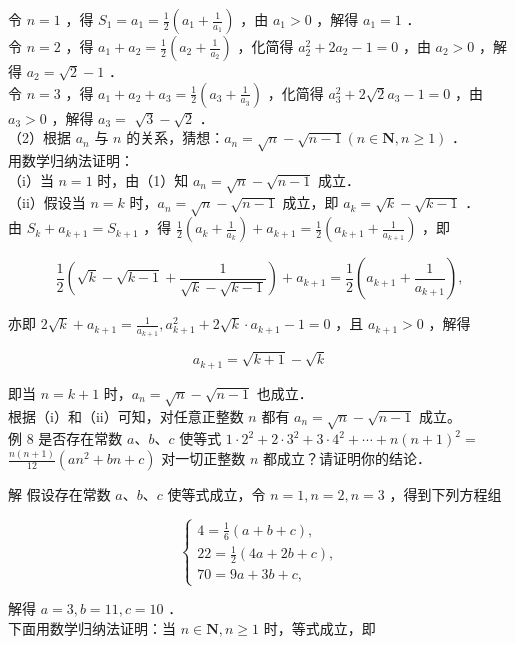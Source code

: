 \documentclass[10pt]{article}
\begin{document}
令 \(n=1\) ，得 \(S_{1}=a_{1}=\frac{1}{2}\left(a_{1}+\frac{1}{a_{1}}\right)\) ，由 \(a_{1}>0\) ，解得 \(a_{1}=1\) ．\\
令 \(n=2\) ，得 \(a_{1}+a_{2}=\frac{1}{2}\left(a_{2}+\frac{1}{a_{2}}\right)\) ，化简得 \(a_{2}^{2}+2 a_{2}-1=0\) ，由 \(a_{2}>0\) ，解得 \(a_{2}=\sqrt{2}-1\) ．\\
令 \(n=3\) ，得 \(a_{1}+a_{2}+a_{3}=\frac{1}{2}\left(a_{3}+\frac{1}{a_{3}}\right)\) ，化简得 \(a_{3}^{2}+2 \sqrt{2} a_{3}-1=0\) ，由 \(a_{3}>0\) ，解得 \(a_{3}=\) \(\sqrt{3}-\sqrt{2}\) ．\\
（2）根据 \(a_{n}\) 与 \(n\) 的关系，猜想：\(a_{n}=\sqrt{n}-\sqrt{n-1}(n \in \mathbf{N}, n \geqslant 1)\) ．\\
用数学归纳法证明：\\
（i）当 \(n=1\) 时，由（1）知 \(a_{n}=\sqrt{n}-\sqrt{n-1}\) 成立．\\
（ii）假设当 \(n=k\) 时，\(a_{n}=\sqrt{n}-\sqrt{n-1}\) 成立，即 \(a_{k}=\sqrt{k}-\sqrt{k-1}\) ．\\
由 \(S_{k}+a_{k+1}=S_{k+1}\) ，得 \(\frac{1}{2}\left(a_{k}+\frac{1}{a_{k}}\right)+a_{k+1}=\frac{1}{2}\left(a_{k+1}+\frac{1}{a_{k+1}}\right)\) ，即

\[
\frac{1}{2}\left(\sqrt{k}-\sqrt{k-1}+\frac{1}{\sqrt{k}-\sqrt{k-1}}\right)+a_{k+1}=\frac{1}{2}\left(a_{k+1}+\frac{1}{a_{k+1}}\right),
\]

亦即 \(2 \sqrt{k}+a_{k+1}=\frac{1}{a_{k+1}}, a_{k+1}^{2}+2 \sqrt{k} \cdot a_{k+1}-1=0\) ，且 \(a_{k+1}>0\) ，解得

\[
a_{k+1}=\sqrt{k+1}-\sqrt{k}
\]

即当 \(n=k+1\) 时，\(a_{n}=\sqrt{n}-\sqrt{n-1}\) 也成立．\\
根据（i）和（ii）可知，对任意正整数 \(n\) 都有 \(a_{n}=\sqrt{n}-\sqrt{n-1}\) 成立。\\
例 8 是否存在常数 \(a 、 b 、 c\) 使等式 \(1 \cdot 2^{2}+2 \cdot 3^{2}+3 \cdot 4^{2}+\cdots+n(n+1)^{2}=\) \(\frac{n(n+1)}{12}\left(a n^{2}+b n+c\right)\) 对一切正整数 \(n\) 都成立？请证明你的结论．

解 假设存在常数 \(a 、 b 、 c\) 使等式成立，令 \(n=1, n=2, n=3\) ，得到下列方程组

\[
\left\{\begin{array}{l}
4=\frac{1}{6}(a+b+c), \\
22=\frac{1}{2}(4 a+2 b+c), \\
70=9 a+3 b+c,
\end{array}\right.
\]

解得 \(a=3, b=11, c=10\) ．\\
下面用数学归纳法证明：当 \(n \in \mathbf{N}, n \geqslant 1\) 时，等式成立，即
\end{document}
